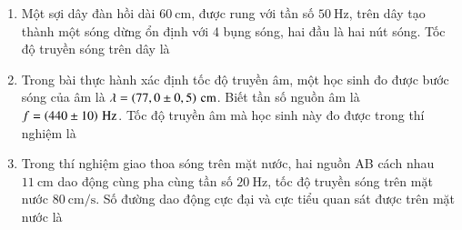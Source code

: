 \begin{enumerate}[label=\bfseries Câu \arabic*:]
\item Một sợi dây đàn hồi dài $\SI{60}{\centi\meter}$, được rung với tần số $\SI{50}{\hertz}$, trên dây tạo thành một sóng dừng ổn định với 4 bụng sóng, hai đầu là hai nút sóng. Tốc độ truyền sóng trên dây là

\item  Trong bài thực hành xác định tốc độ truyền âm, một học sinh đo được bước sóng của âm là $\lambda=\xsi{\left(77,0\pm0,5\right)}{\centi\meter}$. Biết tần số nguồn âm là $f=\xsi{\left(440\pm 10\right)}{\hertz}$. Tốc độ truyền âm mà học sinh này đo được trong thí nghiệm là

\item Trong thí nghiệm giao thoa sóng trên mặt nước, hai nguồn AB cách nhau $\SI{11}{\centi\meter}$ dao động cùng pha cùng tần số $\SI{20}{\hertz}$, tốc độ truyền sóng trên mặt nước $\SI{80}{\centi\meter/\second}$. Số đường dao động cực đại và cực tiểu quan sát được trên mặt nước là


\end{enumerate}
